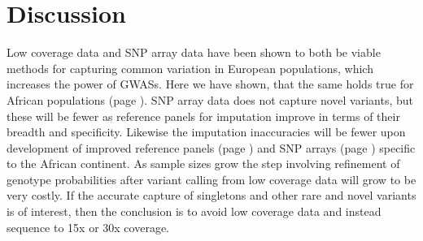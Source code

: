 \section{Discussion}

Low coverage data and SNP array data have been shown to both be viable methods for capturing common variation in European populations\cite{Pasaniuc2012}, which increases the power of \glspl{GWAS}. Here we have shown, that the same holds true for African populations (page \pageref{sec:result_downsampling_sensspec}). SNP array data does not capture novel variants, but these will be fewer as reference panels for imputation improve in terms of their breadth and specificity. Likewise the imputation inaccuracies will be fewer upon development of improved reference panels (page \pageref{ch:reference_panel}) and SNP arrays (page \pageref{ch:chip_design}) specific to the African continent.
As sample sizes grow the step involving refinement of genotype probabilities after variant calling from low coverage data will grow to be very costly. If the accurate capture of singletons and other rare and novel variants is of interest, then the conclusion is to avoid low coverage data and instead sequence to 15x or 30x coverage.
